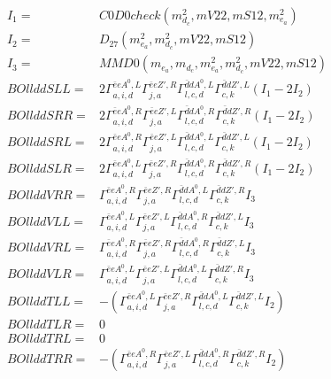 \documentclass[A4,landscape]{article}
\begin{document}
\begin{align} 
I_1 = & C0D0check(m^2_{d_{{c}}}, mV22, mS12, m^2_{e_{{a}}}) \\ 
I_2 = & D_{27}(m^2_{e_{{a}}}, m^2_{d_{{c}}}, mV22, mS12) \\ 
I_3 = & MMD0(m_{e_{{a}}}, m_{d_{{c}}}, m^2_{e_{{a}}}, m^2_{d_{{c}}}, mV22, mS12) \\ 
  BOllddSLL= & 2  \Gamma^{\bar{e}e A^0 ,L}_{a, i, d} \Gamma^{\bar{e}e {Z'} ,R}_{j, a} \Gamma^{\bar{d}d A^0 ,L}_{l, c, d} \Gamma^{\bar{d}d {Z'} ,L}_{c, k} (I_1 - 2 I_2) \\ 
  BOllddSRR= & 2  \Gamma^{\bar{e}e A^0 ,R}_{a, i, d} \Gamma^{\bar{e}e {Z'} ,L}_{j, a} \Gamma^{\bar{d}d A^0 ,R}_{l, c, d} \Gamma^{\bar{d}d {Z'} ,R}_{c, k} (I_1 - 2 I_2) \\ 
  BOllddSRL= & 2  \Gamma^{\bar{e}e A^0 ,R}_{a, i, d} \Gamma^{\bar{e}e {Z'} ,L}_{j, a} \Gamma^{\bar{d}d A^0 ,L}_{l, c, d} \Gamma^{\bar{d}d {Z'} ,L}_{c, k} (I_1 - 2 I_2) \\ 
  BOllddSLR= & 2  \Gamma^{\bar{e}e A^0 ,L}_{a, i, d} \Gamma^{\bar{e}e {Z'} ,R}_{j, a} \Gamma^{\bar{d}d A^0 ,R}_{l, c, d} \Gamma^{\bar{d}d {Z'} ,R}_{c, k} (I_1 - 2 I_2) \\ 
  BOllddVRR= &  \Gamma^{\bar{e}e A^0 ,R}_{a, i, d} \Gamma^{\bar{e}e {Z'} ,R}_{j, a} \Gamma^{\bar{d}d A^0 ,L}_{l, c, d} \Gamma^{\bar{d}d {Z'} ,R}_{c, k} I_3 \\ 
  BOllddVLL= &  \Gamma^{\bar{e}e A^0 ,L}_{a, i, d} \Gamma^{\bar{e}e {Z'} ,L}_{j, a} \Gamma^{\bar{d}d A^0 ,R}_{l, c, d} \Gamma^{\bar{d}d {Z'} ,L}_{c, k} I_3 \\ 
  BOllddVRL= &  \Gamma^{\bar{e}e A^0 ,R}_{a, i, d} \Gamma^{\bar{e}e {Z'} ,R}_{j, a} \Gamma^{\bar{d}d A^0 ,R}_{l, c, d} \Gamma^{\bar{d}d {Z'} ,L}_{c, k} I_3 \\ 
  BOllddVLR= &  \Gamma^{\bar{e}e A^0 ,L}_{a, i, d} \Gamma^{\bar{e}e {Z'} ,L}_{j, a} \Gamma^{\bar{d}d A^0 ,L}_{l, c, d} \Gamma^{\bar{d}d {Z'} ,R}_{c, k} I_3 \\ 
  BOllddTLL= & -( \Gamma^{\bar{e}e A^0 ,L}_{a, i, d} \Gamma^{\bar{e}e {Z'} ,R}_{j, a} \Gamma^{\bar{d}d A^0 ,L}_{l, c, d} \Gamma^{\bar{d}d {Z'} ,L}_{c, k} I_2) \\ 
  BOllddTLR= & 0 \\ 
  BOllddTRL= & 0 \\ 
  BOllddTRR= & -( \Gamma^{\bar{e}e A^0 ,R}_{a, i, d} \Gamma^{\bar{e}e {Z'} ,L}_{j, a} \Gamma^{\bar{d}d A^0 ,R}_{l, c, d} \Gamma^{\bar{d}d {Z'} ,R}_{c, k} I_2) \\ 
\end{align} 
\end{document}
